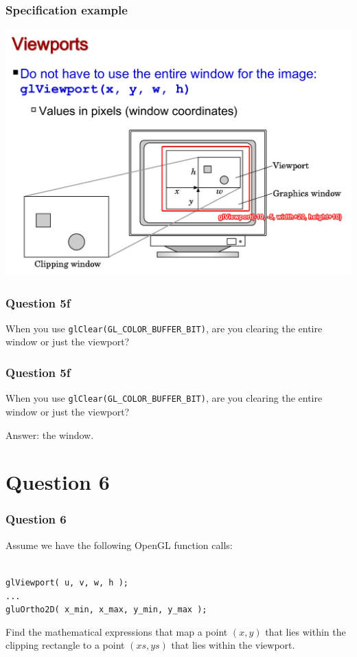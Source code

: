 \documentclass{beamer}
\begin{document}
\begin{frame}
    \frametitle{Specification example}

    \begin{center}
        \includegraphics[scale=0.4]{viewport-window.png}
    \end{center}
    
\end{frame}

\begin{frame}
    \frametitle{Question 5f}

    When you use \texttt{glClear(GL\_COLOR\_BUFFER\_BIT)},
    are you clearing the entire window or just the viewport?
\end{frame}

\begin{frame}
    \frametitle{Question 5f}

    When you use \texttt{glClear(GL\_COLOR\_BUFFER\_BIT)},
    are you clearing the entire window or just the viewport?

    \begin{tcolorbox}
        Answer: the window.
    \end{tcolorbox}
\end{frame}

\section{Question 6}

\begin{frame}
    \frametitle{Question 6}

    Assume we have the following OpenGL function calls:

    \begin{tcolorbox}
        \texttt{\\
            glViewport( u, v, w, h ); \\
            ... \\
            gluOrtho2D( x\_min, x\_max, y\_min, y\_max );\\
        }
    \end{tcolorbox}

    Find the mathematical expressions that map a point $(x, y)$ that lies within the 
    clipping rectangle to a point $(xs, ys)$ that lies within the viewport.
\end{frame}
\end{document}
